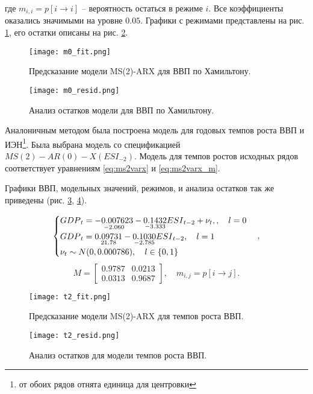 \documentclass[a4paper,14pt]{extreport}
\begin{document}
	где $m_{i,i} = p[i \rightarrow i]$ – вероятность остаться в режиме $i$. Все коэффициенты оказались значимыми на уровне $0.05$. Графики с режимами представлены на рис. \ref{fig:hp-fitcompare}, его остатки описаны на рис. \ref{fig:hp-residcomp}.
	
	{
		\begin{figure}
			\texttt{[image: m0\_fit.png]}
			\caption{Предсказание модели MS(2)-ARX для ВВП по Хамильтону.}
			\label{fig:hp-fitcompare}
		\end{figure}
		\begin{figure}
			\texttt{[image: m0\_resid.png]}
			\caption{Анализ остатков модели для ВВП по Хамильтону.}
			\label{fig:hp-residcomp}
		\end{figure}
	}
	
	
	Аналоничным методом была построена модель для годовых темпов роста ВВП и ИЭН\footnote{от обоих рядов отнята единица для центровки}. Была выбрана модель со спецификацией $MS(2)-AR(0)-X({ESI}_{-2})$. Модель для темпов ростов исходных рядов соответствует уравнениям \ref{eq:ms2varx} и \ref{eq:ms2varx_m}.
	
	Графики ВВП, модельных значений, режимов, и анализа остатков так же приведены (рис. \ref{fig:hp-fitcompare2}, \ref{fig:hp-residcompare2}).
	
	
	{
		\begin{equation}
		\label{eq:ms2varx}
		\begin{cases}
		{GDP}_{t} = 
		\underset{-2.060}{-0.007623} 
		- \underset{-3.333}{0.1432} {ESI}_{t-2}
		+ \nu_{t} , \space 
		, \quad l=0 \\
		{GDP}_{t} = 
		\underset{21.78}{0.09731}
		- \underset{-2.785}{0.1030} {ESI}_{t-2}
		, \quad l=1 \\
		\nu_{t} \sim N(0, 0.000786) , \quad l \in \{0, 1\}
		\end{cases},
		\end{equation}
		\begin{equation}
		\label{eq:ms2varx_m}
		M = 
		\begin{bmatrix}
		0.9787 & 0.0213 \\
		0.0313 & 0.9687
		\end{bmatrix}
		, \quad m_{i,j} = p[i \rightarrow j]
		.
		\end{equation}		
	}
	
	{
		\begin{figure}
			\texttt{[image: t2\_fit.png]}
			\caption{Предсказание модели MS(2)-ARX для темпов роста ВВП.}
			\label{fig:hp-fitcompare2}
		\end{figure}
		\begin{figure}
			\texttt{[image: t2\_resid.png]}
			\caption{Анализ остатков для модели темпов роста ВВП.}
			\label{fig:hp-residcompare2}
		\end{figure}
	}
	
\end{document}
